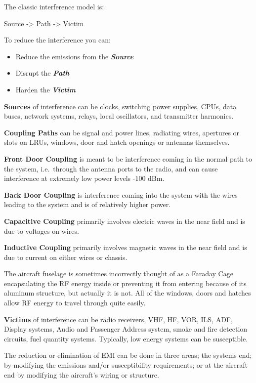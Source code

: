 \documentclass[
]{book}
\providecommand{\tightlist}{%
  \setlength{\itemsep}{0pt}\setlength{\parskip}{0pt}}
\begin{document}
The classic interference model is:

Source -\textgreater{} Path -\textgreater{} Victim

To reduce the interference you can:

\begin{itemize}
\tightlist
\item
  Reduce the emissions from the \textbf{\emph{Source}}
\item
  Disrupt the \textbf{\emph{Path}}
\item
  Harden the \textbf{\emph{Victim}}
\end{itemize}

\textbf{Sources} of interference can be clocks, switching power supplies, CPUs, data
buses, network systems, relays, local oscillators, and transmitter harmonics.

\textbf{Coupling Paths} can be signal and power lines, radiating wires, apertures or
slots on LRUs, windows, door and hatch openings or antennas themselves.

\textbf{Front Door Coupling} is meant to be interference coming in the normal path to
the system, i.e.~through the antenna ports to the radio, and can cause
interference at extremely low power levels \(‑100 \text{ dBm}\).

\textbf{Back Door Coupling} is interference coming into the system with the wires
leading to the system and is of relatively higher power.

\textbf{Capacitive Coupling} primarily involves electric waves in the near field and
is due to voltages on wires.

\textbf{Inductive Coupling} primarily involves magnetic waves in the near field and
is due to current on either wires or chassis.

The aircraft fuselage is sometimes incorrectly thought of as a Faraday Cage
encapsulating the RF energy inside or preventing it from entering because of its
aluminum structure, but actually it is not. All of the windows, doors and
hatches allow RF energy to travel through quite easily.

\textbf{Victims} of interference can be radio receivers, VHF, HF, VOR, ILS, ADF,
Display systems, Audio and Passenger Address system, smoke and fire detection
circuits, fuel quantity systems. Typically, low energy systems can be
susceptible.

The reduction or elimination of EMI can be done in three areas; the systems end;
by modifying the emissions and/or susceptibility requirements; or at the
aircraft end by modifying the aircraft's wiring or structure.
\end{document}
